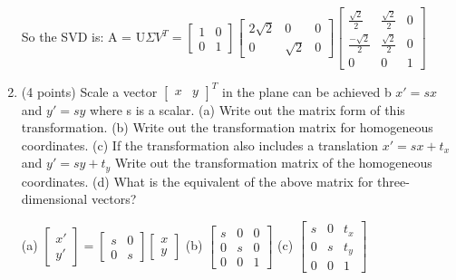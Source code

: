\documentclass{article} %
\begin{document}
\begin{flushleft}
\begin{enumerate}
            \bigbreak So the SVD is:
            \bigbreak A = U$\Sigma V^{T} = \begin{bmatrix}
                1 & 0 \\ 0 & 1
            \end{bmatrix} \begin{bmatrix}
                2\sqrt{2} & 0 & 0 \\ 0 & \sqrt{2} & 0
            \end{bmatrix} \begin{bmatrix}
                \frac{\sqrt{2}}{2} & \frac{\sqrt{2}}{2} & 0 \\ \frac{-\sqrt{2}}{2} & \frac{\sqrt{2}}{2} & 0 \\ 0 & 0 & 1
            \end{bmatrix}$

            \bigbreak
            \bigbreak
            \item (4 points) Scale a vector $\begin{bmatrix}
                x & y
            \end{bmatrix}^{T}$ in the plane can be achieved b $x'=sx$ and $y'=sy$ where s is a scalar.
            \break (a) Write out the matrix form of this transformation.
            \break (b) Write out the transformation matrix for homogeneous coordinates.
            \break (c) If the transformation also includes a translation 
            \break $x' = sx + t_{x}$ and $y' = sy + t_{y}$
            \break Write out the transformation matrix of the homogeneous coordinates.
            \break (d) What is the equivalent of the above matrix for three-dimensional vectors?

            \bigbreak (a) $\begin{bmatrix}
                x' \\ y'
            \end{bmatrix} = \begin{bmatrix}
                s & 0 \\ 0 & s 
            \end{bmatrix} \begin{bmatrix}
                x  \\ y
            \end{bmatrix}$
            \bigbreak (b) $\begin{bmatrix}
                s & 0 & 0 \\ 0 & s & 0 \\ 0 & 0 & 1
            \end{bmatrix}$
            \bigbreak (c) $\begin{bmatrix}
                s & 0 & t_{x} \\ 0 & s & t_{y} \\ 0 & 0 & 1
            \end{bmatrix}$


\end{enumerate}
\end{flushleft}
\end{document}
